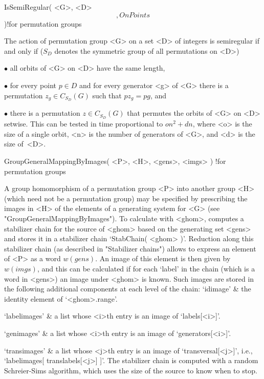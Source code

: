 \>IsSemiRegular( <G>, <D> \[, OnPoints \] )!{for permutation groups}

The   action of  permutation  group <G>   on  a  set <D> of   integers is
semiregular if  and  only if  ($S_D$ denotes the  symmetric  group of all
permutations on <D>)
\beginlist
  \item{$\bullet$} all orbits of <G> on <D> have the same length,
  \item{$\bullet$}  for every point $p\in D$  and for every generator <g>
    of <G> there  is a permutation  $z_g\in C_{S_D}(G)$ such that $pz_g =
    pg$, and
  \item{$\bullet$} there is a permutation $z\in C_{S_D}(G)$ that permutes
    the orbits of <G> on <D> setwise.
\endlist
This can  be tested in time  proportional to $o n^2 +  d n$, where <o> is
the size of a single  orbit, <n> is the number  of generators of <G>, and
<d> is the size of~<D>.


\>GroupGeneralMappingByImages( <P>, <H>, <gens>, <imgs> )%
  !{for permutation groups}

A group homomorphism  of a permutation group  <P> into  another group <H>
(which need not be  a permutation group)  may be specified by prescribing
the images in <H>  of the elements of  a  generating system for  <G> (see
"GroupGeneralMappingByImages"). To calculate with <ghom>, {\GAP} computes
a stabilizer chain for  the source of <ghom> based  on the generating set
<gens> and  stores it   in  a  stabilizer chain `StabChain(   <ghom>  )'.
Reduction along this stabilizer    chain  (as described  in   "Stabilizer
chains") allows to  express an element  of <P>  as  a word  $w(gens)$. An
image of  this  element  is then given   by  $w(imgs)$, and  this can  be
calculated if for each `label'  in the chain  (which is a word in <gens>)
an image under  <ghom> is known. Such  images are stored in the following
additional components at each level of the chain:
\beginitems
`idimage' &
        the identity element of `<ghom>.range'.

`labelimages' &
        a list whose <i>th entry is an image of `labels[<i>]'.

`genimages' &
        a list whose <i>th entry is an image of `generators[<i>]'.

`transimages' &
        a list whose <j>th entry is an image of `transversal[<j>]', i.e.,
        `labelimages[ translabels[<j>] ]'.
\enditems
The stabilizer  chain is computed with  a random Schreier-Sims algorithm,
which uses the size of the source to know when to stop.

